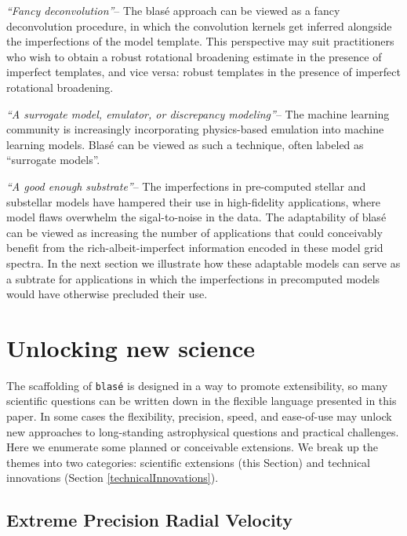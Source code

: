 \documentclass[twocolumn]{aastex631}
\begin{document}
\emph{``Fancy deconvolution''}-- The blas\'e approach can be viewed as a fancy deconvolution procedure, in which the convolution kernels get inferred alongside the imperfections of the model template.  This perspective may suit practitioners who wish to obtain a robust rotational broadening estimate in the presence of imperfect templates, and vice versa: robust templates in the presence of imperfect rotational broadening.

\emph{``A surrogate model, emulator, or discrepancy modeling''}-- The machine learning community is increasingly incorporating physics-based emulation into machine learning models.  Blas\'e can be viewed as such a technique, often labeled as ``surrogate models''.


\emph{``A good enough substrate''}-- The imperfections in pre-computed stellar and substellar models have hampered their use in high-fidelity applications, where model flaws overwhelm the sigal-to-noise in the data.  The adaptability of blas\'e can be viewed as increasing the number of applications that could conceivably benefit from the rich-albeit-imperfect information encoded in these model grid spectra.  In the next section we illustrate how these adaptable models can serve as a subtrate for applications in which the imperfections in precomputed models would have otherwise precluded their use.

\section{Unlocking new science}\label{secFutureWork}

The scaffolding of \texttt{blas\'e} is designed in a way to promote extensibility, so many scientific questions can be written down in the flexible language presented in this paper.  In some cases the flexibility, precision, speed, and ease-of-use may unlock new approaches to long-standing astrophysical questions and practical challenges. Here we enumerate some planned or conceivable extensions.  We break up the themes into two categories: scientific extensions (this Section) and technical innovations (Section \ref{technicalInnovations}).

\subsection{Extreme Precision Radial Velocity} \label{eprv}
\end{document}
